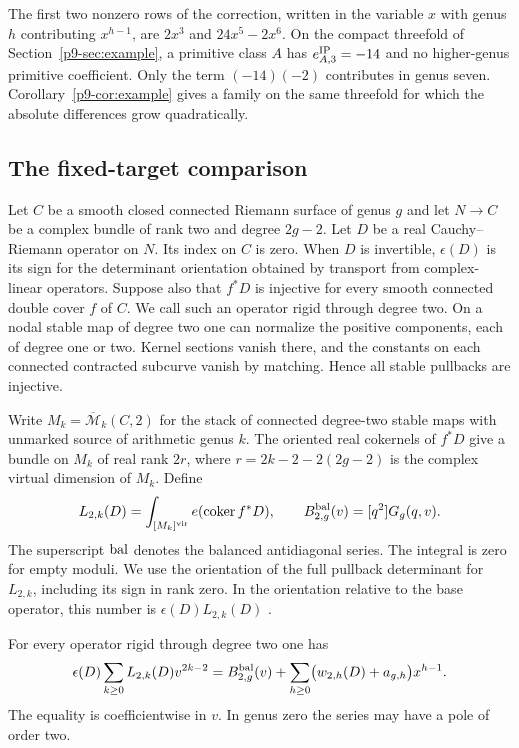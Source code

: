 The first two nonzero rows of the correction, written in the variable
$x$ with genus $h$ contributing $x^{h-1}$, are $2x^3$ and
$24x^5-2x^6$. On the compact threefold of Section~\ref{p9-sec:example},
a primitive class $A$ has $e^{\rm IP}_{A,3}=-14$ and no higher-genus
primitive coefficient. Only the term $(-14)(-2)$ contributes in
genus seven. Corollary~\ref{p9-cor:example} gives a family on the same
threefold for which the absolute differences grow quadratically.

\subsection{The fixed-target comparison}
Let $C$ be a smooth closed connected Riemann surface of genus $g$ and
let $N\to C$ be a complex bundle of rank two and degree $2g-2$. Let $D$
be a real Cauchy--Riemann operator on $N$. Its index on $C$ is zero.
When $D$ is invertible, $\epsilon(D)$ is its sign for the determinant
orientation obtained by transport from complex-linear operators.
Suppose also that $f^*D$ is injective for every smooth connected
double cover $f$ of $C$. We call such an operator rigid through degree
two. On a nodal stable map of degree two one can normalize the positive
components, each of degree one or two. Kernel sections vanish there,
and the constants on each connected contracted subcurve vanish by
matching. Hence all stable pullbacks are injective.

Write $M_k=\overline{\mathcal M}_k(C,2)$ for the stack of connected
degree-two stable maps with unmarked source of arithmetic genus $k$.
The oriented real cokernels of $f^*D$ give a bundle on $M_k$ of real rank
$2r$, where $r=2k-2-2(2g-2)$ is the complex virtual dimension of $M_k$. Define
\[
 L_{2,k}(D)=\int_{[M_k]^{\rm vir}} e(\operatorname{coker} f^*D),
 \qquad B_{2,g}^{\rm bal}(v)=[q^2]G_g(q,v).
\]
The superscript $\rm bal$ denotes the balanced antidiagonal series.
The integral is zero for empty moduli. We use the orientation of the
full pullback determinant for $L_{2,k}$, including its sign in rank
zero. In the orientation relative to the base operator, this number
is $\epsilon(D)L_{2,k}(D)$ \cite[Remark~6.4]{bai}.

\begin{theorem}\label{p9-thm:local}
For every operator rigid through degree two one has
\begin{equation}\label{p9-eq:local}
 \epsilon(D)\sum_{k\ge0}L_{2,k}(D)v^{2k-2}
    = B_{2,g}^{\rm bal}(v)+
       \sum_{h\ge0}\bigl(w_{2,h}(D)+a_{g,h}\bigr)x^{h-1}.
\end{equation}
The equality is coefficientwise in $v$. In genus zero the series may
have a pole of order two.
\end{theorem}

